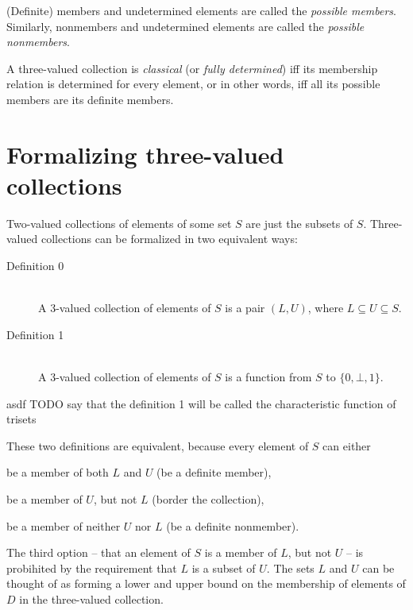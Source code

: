 \documentclass[oneside,12pt]{book}
\theoremstyle{definition}
\theoremstyle{remark}
\begin{document}
(Definite) members and undetermined elements are called the \textit{possible members}.
Similarly, nonmembers and undetermined elements are called the \textit{possible
nonmembers}.

A three-valued collection is \textit{classical} (or \textit{fully determined}) iff
its membership relation is determined for every element, or in other words,
iff all its possible members are its definite members.

\section{Formalizing three-valued collections}
Two-valued collections of elements of some set $S$ are just the subsets of $S$.
Three-valued collections can be formalized in two equivalent ways:

\begin{defBox}
  \begin{description}
    \item[Definition 0] \hfill \\
      A 3-valued collection of elements of $S$ is a pair $(L, U)$, where
      $L \subseteq U \subseteq S$.
    \item[Definition 1] \hfill \\
      A 3-valued collection of elements of $S$ is a function from $S$
      to $\{ 0, \bot, 1 \}$.
  \end{description}
\end{defBox}

asdf TODO say that the definition 1 will be called the characteristic function
of trisets

\noindent These two definitions are equivalent, because every element of $S$ can either
\begin{compactenum}
  \item be a member of both $L$ and $U$ (be a definite member),
  \item be a member of $U$, but not $L$ (border the collection),
  \item be a member of neither $U$ nor $L$ (be a definite nonmember).
\end{compactenum}

\medskip \noindent The third option -- that an element of $S$ is a member of $L$,
but not $U$ -- is probihited by the requirement that $L$ is a subset of $U$.
The sets $L$ and $U$ can be thought of as forming a lower and upper bound on
the membership of elements of $D$ in the three-valued collection.
\end{document}
